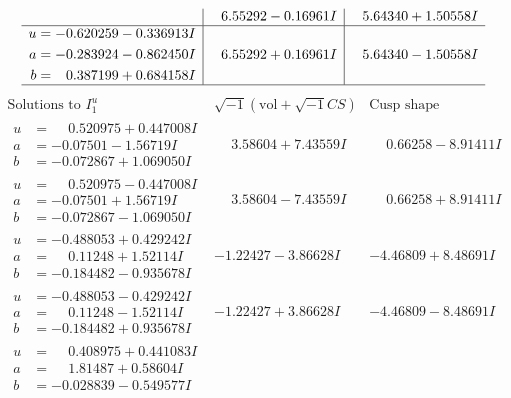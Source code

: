 \documentclass[1p]{elsarticle_modified}
\theoremstyle{definition}
\newcommand{\I}{\sqrt{-1}}
\begin{document}
$$\begin{array}{c|c|c}
 & \phantom{-}6.55292 - 0.16961 I & \phantom{-}5.64340 + 1.50558 I \\ \hline\begin{aligned}
u &= -0.620259 - 0.336913 I \\
a &= -0.283924 - 0.862450 I \\
b &= \phantom{-}0.387199 + 0.684158 I\end{aligned}
 & \phantom{-}6.55292 + 0.16961 I & \phantom{-}5.64340 - 1.50558 I\\
 \hline 
 \end{array}$$\newpage$$\begin{array}{c|c|c}  
\text{Solutions to }I^u_{1}& \I (\text{vol} + \sqrt{-1}CS) & \text{Cusp shape}\\
 \hline 
\begin{aligned}
u &= \phantom{-}0.520975 + 0.447008 I \\
a &= -0.07501 - 1.56719 I \\
b &= -0.072867 + 1.069050 I\end{aligned}
 & \phantom{-}3.58604 + 7.43559 I & \phantom{-}0.66258 - 8.91411 I \\ \hline\begin{aligned}
u &= \phantom{-}0.520975 - 0.447008 I \\
a &= -0.07501 + 1.56719 I \\
b &= -0.072867 - 1.069050 I\end{aligned}
 & \phantom{-}3.58604 - 7.43559 I & \phantom{-}0.66258 + 8.91411 I \\ \hline\begin{aligned}
u &= -0.488053 + 0.429242 I \\
a &= \phantom{-}0.11248 + 1.52114 I \\
b &= -0.184482 - 0.935678 I\end{aligned}
 & -1.22427 - 3.86628 I & -4.46809 + 8.48691 I \\ \hline\begin{aligned}
u &= -0.488053 - 0.429242 I \\
a &= \phantom{-}0.11248 - 1.52114 I \\
b &= -0.184482 + 0.935678 I\end{aligned}
 & -1.22427 + 3.86628 I & -4.46809 - 8.48691 I \\ \hline\begin{aligned}
u &= \phantom{-}0.408975 + 0.441083 I \\
a &= \phantom{-}1.81487 + 0.58604 I \\
b &= -0.028839 - 0.549577 I\end{aligned}

\end{array}$$
\end{document}
